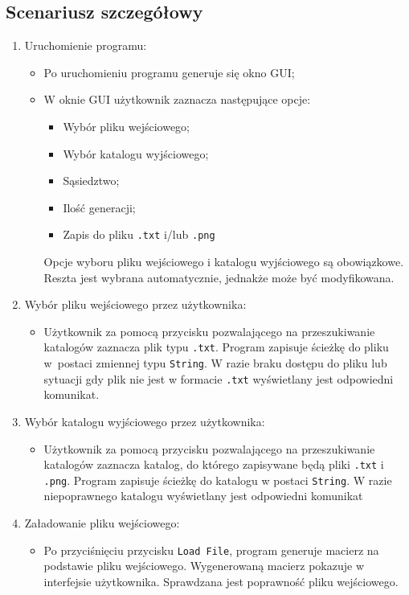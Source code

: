 \documentclass[a4paper,12pt]{article}
\begin{document}
\subsection{Scenariusz szczegółowy}
\begin{enumerate}
\item Uruchomienie programu:
	\begin{itemize}
	\item Po uruchomieniu programu generuje się okno GUI;
	\item W oknie GUI użytkownik zaznacza następujące opcje:
		\begin{itemize}
			\item Wybór pliku wejściowego;
			\item Wybór katalogu wyjściowego;
			\item Sąsiedztwo;
			\item Ilość generacji;
			\item Zapis do pliku \texttt{.txt} i/lub \texttt{.png}
		\end{itemize}
		Opcje wyboru pliku wejściowego i katalogu wyjściowego są obowiązkowe. Reszta jest wybrana automatycznie, jednakże może być modyfikowana.
	\end{itemize}
\item Wybór pliku wejściowego przez użytkownika:
	\begin{itemize}
		\item Użytkownik za pomocą przycisku pozwalającego na przeszukiwanie katalogów zaznacza plik typu \texttt{.txt}. Program zapisuje ścieżkę do pliku w~postaci zmiennej typu \texttt{String}. W razie braku dostępu do pliku lub sytuacji gdy plik nie jest w formacie \texttt{.txt} wyświetlany jest odpowiedni komunikat.
	\end{itemize}
\item Wybór katalogu wyjściowego przez użytkownika:
	\begin{itemize}
		\item Użytkownik za pomocą przycisku pozwalającego na przeszukiwanie katalogów zaznacza katalog, do którego zapisywane będą pliki \texttt{.txt} i \texttt{.png}. Program zapisuje ścieżkę do katalogu w postaci \texttt{String}. W razie niepoprawnego katalogu wyświetlany jest odpowiedni komunikat 
	\end{itemize}
\item Załadowanie pliku wejściowego:
	\begin{itemize}
	\item Po przyciśnięciu przycisku \texttt{Load File}, program generuje macierz na podstawie pliku wejściowego. Wygenerowaną macierz pokazuje w interfejsie użytkownika. Sprawdzana jest poprawność pliku wejściowego.

\end{itemize}
\end{enumerate}
\end{document}

